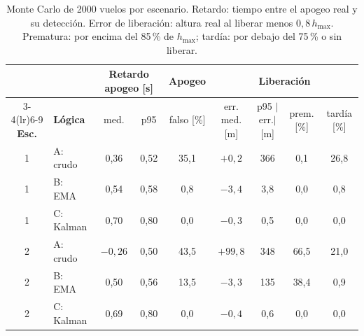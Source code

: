 \begin{table}[H]
\centering\small
\caption{Monte Carlo de \num{2000} vuelos por escenario. Retardo: tiempo entre el apogeo real
y su detección. Error de liberación: altura real al liberar menos $0{,}8\,h_{\max}$.
Prematura: por encima del 85\,\% de $h_{\max}$; tardía: por debajo del 75\,\% o sin
liberar.}\label{tab:electronica-mc}
\setlength{\tabcolsep}{4.5pt}
\begin{tabular}{@{}clccccccc@{}}
\toprule
& & \multicolumn{2}{c}{\textbf{Retardo apogeo} [s]} & \textbf{Apogeo} & \multicolumn{4}{c}{\textbf{Liberación}}\\
\cmidrule(lr){3-4}\cmidrule(lr){6-9}
\textbf{Esc.} & \textbf{Lógica} & med. & p95 & falso [\%] & err. med. [m] & p95 $|$err.$|$ [m] & prem. [\%] & tardía [\%]\\\midrule
1 & A: crudo     & 0,36 & 0,52 & 35,1 & $+0{,}2$ & 366 & 0,1 & 26,8\\
1 & B: EMA       & 0,54 & 0,58 & 0,8  & $-3{,}4$ & 3,8 & 0,0 & 0,8\\
1 & C: Kalman    & 0,70 & 0,80 & 0,0  & $-0{,}3$ & 0,5 & 0,0 & 0,0\\\midrule
2 & A: crudo     & $-0{,}26$ & 0,50 & 43,5 & $+99{,}8$ & 348 & 66,5 & 21,0\\
2 & B: EMA       & 0,50 & 0,56 & 13,5 & $-3{,}3$ & 135 & 38,4 & 0,9\\
2 & C: Kalman    & 0,69 & 0,80 & 0,0  & $-0{,}4$ & 0,6 & 0,0 & 0,0\\
\bottomrule
\end{tabular}
\end{table}


